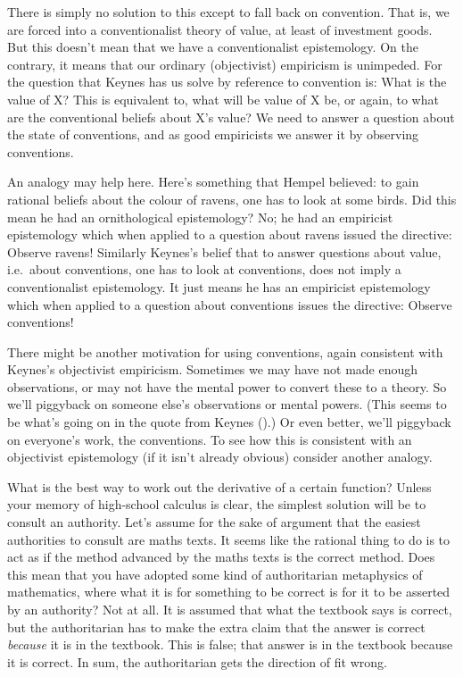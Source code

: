 \documentclass[
  11pt,
  letterpaper,
  DIV=11,
  numbers=noendperiod,
  twoside]{scrartcl}
\begin{document}
There is simply no solution to this except to fall back on convention.
That is, we are forced into a conventionalist theory of value, at least
of investment goods. But this doesn't mean that we have a
conventionalist epistemology. On the contrary, it means that our
ordinary (objectivist) empiricism is unimpeded. For the question that
Keynes has us solve by reference to convention is: What is the value of
X? This is equivalent to, what will be value of X be, or again, to what
are the conventional beliefs about X's value? We need to answer a
question about the state of conventions, and as good empiricists we
answer it by observing conventions.

An analogy may help here. Here's something that Hempel believed: to gain
rational beliefs about the colour of ravens, one has to look at some
birds. Did this mean he had an ornithological epistemology? No; he had
an empiricist epistemology which when applied to a question about ravens
issued the directive: Observe ravens! Similarly Keynes's belief that to
answer questions about value, i.e.~about conventions, one has to look at
conventions, does not imply a conventionalist epistemology. It just
means he has an empiricist epistemology which when applied to a question
about conventions issues the directive: Observe conventions!

There might be another motivation for using conventions, again
consistent with Keynes's objectivist empiricism. Sometimes we may have
not made enough observations, or may not have the mental power to
convert these to a theory. So we'll piggyback on someone else's
observations or mental powers. (This seems to be what's going on in the
quote from Keynes ().) Or even better,
we'll piggyback on everyone's work, the conventions. To see how this is
consistent with an objectivist epistemology (if it isn't already
obvious) consider another analogy.

What is the best way to work out the derivative of a certain function?
Unless your memory of high-school calculus is clear, the simplest
solution will be to consult an authority. Let's assume for the sake of
argument that the easiest authorities to consult are maths texts. It
seems like the rational thing to do is to act as if the method advanced
by the maths texts is the correct method. Does this mean that you have
adopted some kind of authoritarian metaphysics of mathematics, where
what it is for something to be correct is for it to be asserted by an
authority? Not at all. It is assumed that what the textbook says is
correct, but the authoritarian has to make the extra claim that the
answer is correct \emph{because} it is in the textbook. This is false;
that answer is in the textbook because it is correct. In sum, the
authoritarian gets the direction of fit wrong.
\end{document}
